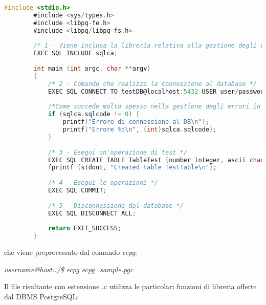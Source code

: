 \documentclass[12pt,a4paper,onecolumn]{article}
\begin{document}
	\begin{lstlisting}[language=C, caption=testECPG.pgc]
		#include <stdio.h>
		#include <sys/types.h>
		#include <libpq-fe.h>
		#include <libpq/libpq-fs.h>
		
		/* 1 - Viene inclusa la libreria relativa alla gestione degli errori tramite la variabile globale sqlca (SQL communication area) */
		EXEC SQL INCLUDE sqlca;
		
		int main (int argc, char **argv)
		{
			/* 2 - Comando che realizza la connessione al database */
			EXEC SQL CONNECT TO testDB@localhost:5432 USER user/password;
			
			/*Come succede molto spesso nella gestione degli errori in linguaggio C, il valore ritornato da una funzione viene utilizzato anche come codice di errore, considerando lo 0 come esecuzione andata a buon fine */
			if (sqlca.sqlcode != 0)	{
				printf("Errore di connessione al DB\n");
				printf("Errore %d\n", (int)sqlca.sqlcode);
			}
			
			/* 3 - Esegui un'operazione di test */
			EXEC SQL CREATE TABLE TableTest (number integer, ascii char(16));
			fprintf (stdout, "Created table TestTable\n");
			
			/* 4 - Esegui le operazioni */
			EXEC SQL COMMIT;
			
			/* 5 - Disconnessione dal database */
			EXEC SQL DISCONNECT ALL;
			
			return EXIT_SUCCESS;
		}
	\end{lstlisting}

	che viene preprocessato dal comando \textit{ecpg}:
	
	\begin{center}
		\textit{username@host:./\$ ecpg ecpg\_sample.pgc}
	\end{center}
	
	Il file risultante con estensione \textsf{.c} utilizza le particolari funzioni di libreria offerte dal DBMS PostgreSQL:
	
\end{document}
